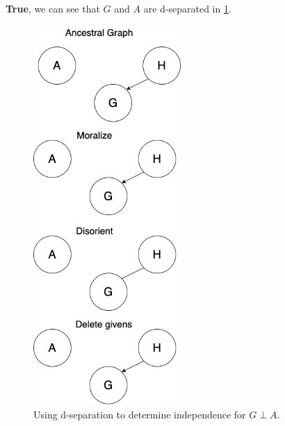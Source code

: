 \documentclass[10pt, a4paper, english]{../Template/NTNUoving}
\begin{document}
\begin{oppgave}
    \begin{punkt}
        \textbf{True}, we can see that $G$ and $A$ are d-separated in \ref{fig:2b}.
        \begin{figure}[H]
            \centering
            \includegraphics[width=0.5\textwidth]{Task2b.png}
            \caption{Using d-separation to determine independence for $G \perp A$.}
            \label{fig:2b}
            \end{figure}
    \end{punkt}


\end{oppgave}
\end{document}

